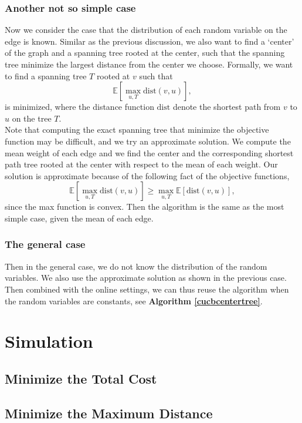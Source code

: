 \documentclass{article}
\theoremstyle{plain}
\theoremstyle{definition}
\theoremstyle{remark}
\begin{document}
    \subsubsection{Another not so simple case}
    Now we consider the case that the distribution of each random variable on the edge is known. Similar as the previous discussion, we also want to find a `center' of the graph and a spanning tree rooted at the center, such that the spanning tree minimize the largest distance from the center we choose. Formally, we want to find a spanning tree $T$ rooted at $v$ such that
    \[\mathbb E[\max_{u,T}\text{dist}(v,u)],\]
    is minimized, where the distance function $\text{dist}$ denote the shortest path from $v$ to $u$ on the tree $T$.\\

    Note that computing the exact spanning tree that minimize the objective function may be difficult, and we try an approximate solution. We compute the mean weight of each edge and we find the center and the corresponding shortest path tree rooted at the center with respect to the mean of each weight. Our solution is approximate because of the following fact of the objective functions,
    \[\mathbb E[\max_{u,T}\text{dist}(v,u)] \ge \max_{u,T}\mathbb E[\text{dist}(v,u)],\]
    since the max function is convex. Then the algorithm is the same as the most simple case, given the mean of each edge.

    \subsubsection{The general case}
    Then in the general case, we do not know the distribution of the random variables. We also use the approximate solution as shown in the previous case. Then combined with the online settings, we can thus reuse the algorithm when the random variables are constants, see \textbf{Algorithm \ref{cucbcentertree}}.

    \section{Simulation}
    \subsection{Minimize the Total Cost}

    \subsection{Minimize the Maximum Distance}
\end{document}
